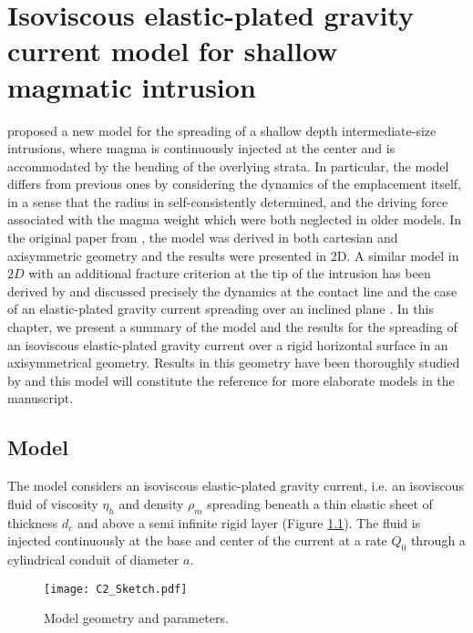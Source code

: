 \chapter{Isoviscous elastic-plated  gravity current model  for shallow
  magmatic intrusion}

\label{chap2} 
\minitoc

\citet{Michaut:2011kg} proposed  a new  model for  the spreading  of a
shallow   depth   intermediate-size   intrusions,   where   magma   is
continuously injected at the center and is accommodated by the bending
of  the  overlying strata.   In  particular,  the model  differs  from
previous ones by  considering the dynamics of  the emplacement itself,
in a  sense that the  radius in self-consistently determined,  and the
driving  force  associated  with  the magma  weight  which  were  both
neglected   in   older   models.    In   the   original   paper   from
\citet{Michaut:2011kg}, the  model was  derived in both  cartesian and
axisymmetric geometry and the results  were presented in 2D. A similar
model in $2D$ with an additional  fracture criterion at the tip of the
intrusion    has   been    derived   by    \citet{Bunger:2011cb}   and
\citet{Anonymous:QWXp_4JV}  discussed precisely  the  dynamics at  the
contact  line  and  the  case of  an  elastic-plated  gravity  current
spreading over an inclined  plane \citep{Anonymous:QWXp_4JV}.  In this
chapter, we  present a summary  of the model  and the results  for the
spreading of an isoviscous elastic-plated gravity current over a rigid
horizontal  surface in  an axisymmetrical  geometry.  Results  in this
geometry  have been  thoroughly studied  by \citet{Lister:2013ia}  and
this model will constitute the  reference for more elaborate models in
the manuscript.

\section{Model}
\label{C2-sec:model}

The model considers an isoviscous elastic-plated gravity current, i.e.
an  isoviscous  fluid  of  viscosity  $\eta_h$  and  density  $\rho_m$
spreading beneath a thin elastic sheet  of thickness $d_c$ and above a
semi infinite rigid layer \citep{Michaut:2011kg,Bunger:2011cb} (Figure
\ref{C2-Sketch}).  The fluid is injected  continuously at the base and
center of the current at a rate $Q_0$ through a cylindrical conduit of
diameter $a$.

\begin{figure}[h!]
  \begin{center}
    \graphicspath{ {/Users/thorey/Documents/These/Manuscript/Figure/Chapter2/} }
    \texttt{[image: C2\_Sketch.pdf]}
    \caption{Model geometry and parameters.}
    \label{C2-Sketch}
  \end{center}
\end{figure}

